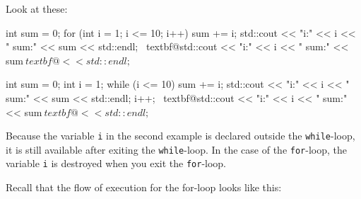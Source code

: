 Look at these:
\begin{console}[commandchars=\~\@\$]
int sum = 0;
for (int i = 1; i <= 10; i++)
{   
    sum += i;
    std::cout << "i:" << i << " sum:" << sum
              << std::endl;
}
~textbf@std::cout << "i:" << i << " sum:" << sum$
          ~textbf@<< std::endl;$
\end{console}
\begin{console}[commandchars=\~\@\$]
int sum = 0;
int i = 1;
while (i <= 10)
{     
      sum += i;
      std::cout << "i:" << i << " sum:" << sum <<
      std::endl;
      i++;
}
~textbf@std::cout << "i:" << i << " sum:" << sum$
          ~textbf@<< std::endl;$
\end{console}
Because the variable \texttt{i} in the second example is declared outside
the \texttt{while}-loop, it is still available after exiting the
\texttt{while}-loop. In the case of the \texttt{for}-loop, the variable
\texttt{i} is destroyed when you exit the \texttt{for}-loop.

\newpage{}

Recall that the flow of execution for the for-loop looks like this:













         
               






